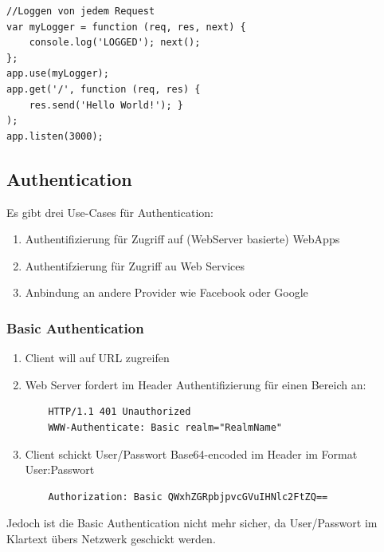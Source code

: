 \documentclass[a4paper, 11pt]{article}
\begin{document}
\begin{lstlisting}
//Loggen von jedem Request
var myLogger = function (req, res, next) { 
	console.log('LOGGED'); next(); 
};
app.use(myLogger); 
app.get('/', function (req, res) { 
	res.send('Hello World!'); }
);
app.listen(3000);
\end{lstlisting}

\subsection{Authentication}
Es gibt drei Use-Cases für Authentication:

\begin{enumerate}
	\item Authentifizierung für Zugriff auf (WebServer basierte) WebApps
	\item Authentifzierung für Zugriff au Web Services
	\item Anbindung an andere Provider wie Facebook oder Google
\end{enumerate}

\subsubsection{Basic Authentication}
\begin{enumerate}
	\item Client will auf URL zugreifen
	\item Web Server fordert im Header Authentifizierung für einen Bereich an: \\
	\begin{lstlisting}
	HTTP/1.1 401 Unauthorized 
	WWW-Authenticate: Basic realm="RealmName"
	\end{lstlisting}
	\item Client schickt User/Passwort Base64-encoded im Header im Format User:Passwort \\
	\begin{lstlisting}
	Authorization: Basic QWxhZGRpbjpvcGVuIHNlc2FtZQ==
	\end{lstlisting}
\end{enumerate}

Jedoch ist die Basic Authentication nicht mehr sicher, da User/Passwort im Klartext übers Netzwerk geschickt werden.
\end{document}
